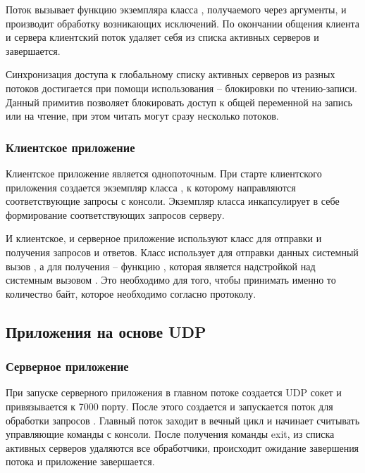Поток  вызывает функцию  экземпляра класса , получаемого через аргументы, и производит обработку возникающих исключений. По окончании общения клиента и сервера клиентский поток удаляет себя из списка активных серверов и завершается.

Синхронизация доступа к глобальному списку активных серверов из разных потоков достигается при помощи использования  -- блокировки по чтению-записи. Данный примитив позволяет блокировать доступ к общей переменной на запись или на чтение, при этом читать могут сразу несколько потоков.

\subsubsection{Клиентское приложение}

Клиентское приложение является однопоточным. При старте клиентского приложения создается экземпляр класса , к которому направляются соответствующие запросы с консоли. Экземпляр класса инкапсулирует в себе формирование соответствующих запросов серверу. 

И клиентское, и серверное приложение используют класс  для отправки и получения запросов и ответов. Класс  использует для отправки данных системный вызов , а для получения -- функцию , которая является надстройкой над системным вызовом . Это необходимо для того, чтобы принимать именно то количество байт, которое необходимо согласно протоколу.


\subsection{Приложения на основе UDP}

\subsubsection{Серверное приложение}

При запуске серверного приложения в главном потоке создается UDP сокет и привязывается к 7000 порту. После этого создается и запускается поток для обработки запросов . Главный поток заходит в вечный цикл и начинает считывать управляющие команды с консоли. После получения команды exit, из списка активных серверов удаляются все обработчики, происходит ожидание завершения потока  и приложение завершается.

